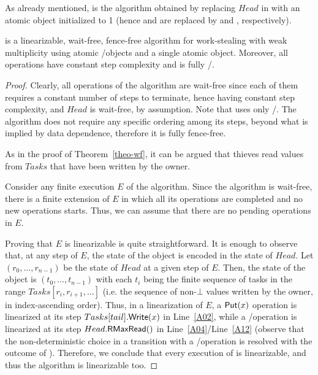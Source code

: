 As already mentioned, \NCWSM is the algorithm obtained by replacing \(Head\) in \WFWSM with an atomic \RangeMaxReg object initialized to 1 (hence \MaxR and \MaxW are replaced by \RMaxR and \RMaxW, respectively).


\begin{theorem}\label{theo-wf-nc}
\NCWSM is a linearizable, wait-free, fence-free algorithm for work-stealing with weak multiplicity using atomic \R/\W objects and a single atomic \RangeMaxReg object.  Moreover, all operations have constant step complexity and \Put is fully \R/\W.
\end{theorem}

\begin{proof}

Clearly, all operations of the algorithm are wait-free since each of them requires a constant number of steps to terminate, hence having constant step complexity, and \(Head\) is wait-free, by assumption.  Note that \Put uses only \R/\W.  The algorithm does not require any specific ordering among its steps, beyond what is implied by data dependence, therefore it is fully fence-free.

As in the proof of Theorem~\ref{theo-wf}, it can be argued that thieves read values from \(Tasks\) that have been written by the owner.

Consider any finite execution \(E\) of the algorithm.  Since the algorithm is wait-free, there is a finite extension of \(E\) in which all its operations are completed and no new operations starts. Thus, we can assume that there are no pending operations in \(E\).

Proving that \(E\) is linearizable is quite straightforward. It is enough to observe that, at any step of \(E\), the state of the object is encoded in the state of \(Head\). Let \((r_0, \hdots, r_{n-1})\) be the state of \(Head\) at a given step of \(E\). Then, the state of the object is \((t_0, \hdots, t_{n-1})\) with each \(t_i\) being the finite sequence of tasks in the range \(Tasks[r_i, r_{i+1}, \hdots]\) (i.e. the sequence of non-\(\bot\) values written by the owner, in index-ascending order).  Thus, in a linearization of \(E\), a \({\sf \small Put}(x)\) operation is linearized at its step \(Tasks[tail].{\sf \small Write}(x)\) in Line~\ref{A02}, while a \Take/\Steal operation is linearized at its step \(Head.{\sf \small RMaxRead}()\) in Line~\ref{A04}/Line~\ref{A12} (observe that the non-deterministic choice in a transition with a \Take/\Steal operation is resolved with the outcome of \RMaxR).  Therefore, we conclude that every execution of \NCWSM is linearizable, and thus the algorithm is linearizable too.
\end{proof}

